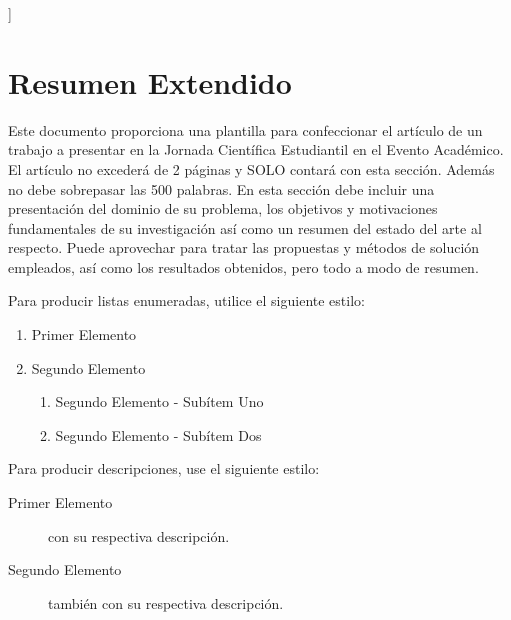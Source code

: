 \documentclass[a4paper,10pt,twocolumn]{article}
\begin{document}
\vspace{0.8cm}
]



\section{Resumen Extendido}\label{sec:intro}
  Este documento proporciona una plantilla para confeccionar el artículo de un 
  trabajo a presentar en la Jornada Científica Estudiantil en el Evento Académico. El artículo no excederá 
  de 2 páginas y SOLO contará con esta sección. Además no debe sobrepasar las 500 palabras. En esta sección debe incluir una presentación del dominio de su 
  problema, los objetivos y motivaciones fundamentales de su investigación así como 
  un resumen del estado del arte al respecto. Puede aprovechar para tratar las propuestas y métodos de solución empleados, así como los resultados obtenidos, pero todo a modo de resumen.
  
Para producir listas enumeradas, utilice el siguiente estilo:
\begin{enumerate}
	\item Primer Elemento
	\item Segundo Elemento
	\begin {enumerate}
	\item {Segundo Elemento - Subítem Uno}
	\item {Segundo Elemento - Subítem Dos}
	\end {enumerate}
\end{enumerate}

Para producir descripciones, use el siguiente estilo:

\begin{description}
	\item [Primer Elemento] con su respectiva descripción.
	\item [Segundo Elemento] también con su respectiva descripción.
\end{description}
\end{document}
